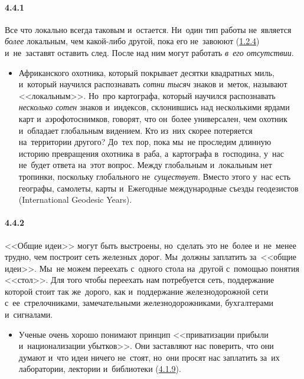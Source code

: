 \paragraph{4.4.1}\hypertarget{par:4.4.1}{} Все что локально всегда таковым и~остается. Ни~один тип работы не~является {\itshape более} локальным, чем какой-либо другой, пока его не~завоюют (\hyperlink{par:1.2.4}{1.2.4}) и~не~заставят оставить след. После над ним могут работать {\itshape в~его отсутствии}.
	\begin{itemize}
	\item 
	Африканского охотника, который покрывает десятки квадратных миль, и~который научился распознавать {\itshape сотни} {\itshape тысяч} знаков и~меток, называют <<локальным>>. Но~про картографа, который научился распознавать {\itshape несколько сотен} знаков и~индексов, склонившись над несколькими ярдами карт и~аэрофотоснимков, говорят, что он~более универсален, чем охотник и~обладает глобальным видением. Кто из~них скорее потеряется на~территории другого? До~тех пор, пока мы~не проследим длинную историю превращения охотника в~раба, а~картографа в~господина, у~нас не~будет ответа на~этот вопрос. Между глобальным и~локальным нет тропинки, поскольку глобального не~{\itshape существует}. Вместо этого у~нас есть географы, самолеты, карты и~Ежегодные международные съезды геодезистов (International Geodesic Years).
	\end{itemize}	


\paragraph{4.4.2}\hypertarget{par:4.4.2}{} <<Общие идеи>> могут быть выстроены, но~сделать это не~более и~не~менее трудно, чем построит сеть железных дорог. Мы~должны заплатить за~<<общие идеи>>. Мы~не можем переехать с~одного стола на~другой с~помощью понятия <<стол>>. Для того чтобы переехать нам потребуется сеть, поддержание которой стоит так же~дорого, как и~поддержание железнодорожной сети с~ее~стрелочниками, замечательными железнодорожниками, бухгалтерами и~сигналами. 
	\begin{itemize}
	\item 
	Ученые очень хорошо понимают принцип <<приватизации прибыли и~национализации убытков>>. Они заставляют нас поверить, что они думают и~что идеи ничего не~стоят, но~они просят нас заплатить за~их лаборатории, лектории и~библиотеки (\hyperlink{par:4.1.9}{4.1.9}).
	\end{itemize}	


